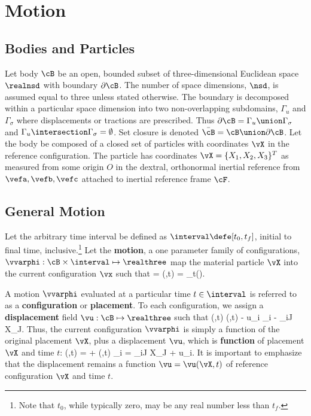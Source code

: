 \chapter{Motion}
\section{Bodies and Particles}

Let body $\cB$ be an open, bounded subset of three-dimensional           
Euclidean space $\realnsd$ with boundary $\partial \cB$.                 
The number of space dimensions, $\nsd$, is assumed equal                    
to three unless stated otherwise.
The boundary is decomposed within a particular space dimension into         
two non-overlapping subdomains, $\Gamma_u$ and $\Gamma_{\sigma}$        
where displacements or tractions are prescribed.  Thus                      
$\partial \cB = \Gamma_u \union \Gamma_{\sigma}$ and 
$\Gamma_u \intersection \Gamma_{\sigma} = \emptyset$.           
Set closure is denoted                                                      
$\bar{\cB} = \cB \union \partial \cB$.                             
Let the body be composed of a closed set of particles with 
coordinates $\vX$ in the reference configuration.  The particle
has coordinates $\vX = \{X_1, X_2, X_3\}^T$ as measured from
some origin $O$ in the dextral, orthonormal inertial reference
from $\vefa, \vefb, \vefc$ attached to inertial
reference frame $\cF$.


\section{General Motion}
Let the arbitrary time interval be defined as
$\interval \defe [t_0,t_f]$, initial to final
time, inclusive.\footnote{Note that $t_0$, while
typically zero, may be any real number less than $t_f$.}  
Let the {\bf motion}, a one parameter family of configurations, 
$\vvarphi : \cB \times \interval \mapsto \realthree$ 
map the material particle
$\vX$ into the current configuration $\vx$ such that
\be
\vx = \vvarphi(\vX,t) = \vvarphi_t(\vX).
\label{eq:motion}
\ee

A motion $\vvarphi$ evaluated
at a particular time $t \in \interval$ 
is referred to as a {\bf configuration} or
{\bf placement}.  To each configuration, we assign a {\bf displacement}
field $\vu: \cB \mapsto \realthree$ such that 
\be
\vu(\vX,t)  \vvarphi(\vX,t) - \vX 
\;\;\Longleftrightarrow\;\;
u_i  \varphi_i - \delta_{iJ} X_J.
\label{eq:displacement}
\ee
Thus, the current configuration $\vvarphi$ is simply a function 
of the original
placement $\vX$, 
plus a displacement $\vu$, which is {\bf function}
of placement $\vX$ and time $t$:
\be
\vvarphi(\vX,t) = \vX + \vu(\vX,t)
\;\; \Longleftrightarrow \;\;
\varphi_i = \delta_{iJ} X_J + u_i.
\label{eq:displacement_vvarphi}
\ee
It is important to
emphasize that the displacement remains a function $\vu = \vu(\vX, t)$
of reference configuration $\vX$ and time $t$.  
%


